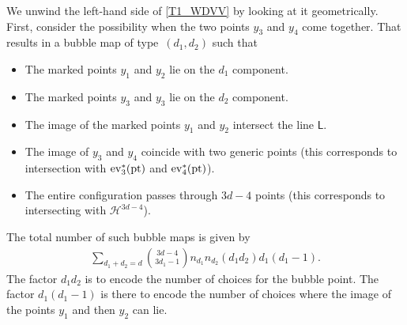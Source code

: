 \documentclass[pdftex]{sigma}
\numberwithin{equation}{section}
\begin{document}
We unwind the left-hand side of \eqref{T1_WDVV} by looking at it geometrically.
First, consider the possibility when the two points $y_3$ and $y_4$ come together.
That results in a bubble map of type~$(d_1, d_2)$ such that
\begin{itemize}\itemsep=0pt
 \item The marked points $y_1$ and $y_2$ lie on the $d_1$ component.
 \item The marked points $y_3$ and $y_3$ lie on the $d_2$ component.
 \item The image of the marked points $y_1$ and $y_2$ intersect the line $\mathsf{L}$.
 \item The image of $y_3$ and $y_4$ coincide with two generic points (this corresponds to intersection with
 ${\rm ev}_3^*(\textnormal{pt})$ and ${\rm ev}_4^*(\textnormal{pt})$).
 \item The entire configuration passes through $3d-4$ points \big(this corresponds to intersecting with $\mathcal{H}^{3d-4}$\big).
\end{itemize}
The total number of such bubble maps is given by
\begin{align*}
\sum_{d_1+d_2 = d} \binom{3d-4}{3d_1-1} n_{d_1} n_{d_2} (d_1 d_2) d_1 (d_1 -1).
\end{align*}
The factor $d_1 d_2$ is to encode the number of choices for the bubble point. The factor $d_1(d_1-1)$
is there to encode the number of choices where the image of the points $y_1$ and then $y_2$ can lie.
\end{document}
